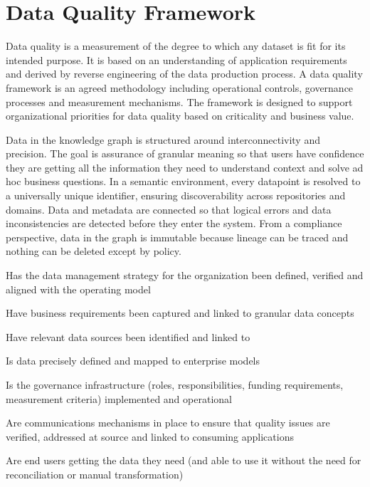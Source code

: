 \section{Data Quality Framework}\label{sec:ekgmm-b-3-1} %

Data quality is a measurement of the degree to which any dataset is fit for its intended purpose.
It is based on an understanding of application requirements and derived by reverse engineering of the data production process.
A data quality framework is an agreed methodology including operational controls, governance processes and measurement mechanisms.
The framework is designed to support organizational priorities for data quality based on criticality and business value.

\kgmmekgrationalesection

Data in the knowledge graph is structured around interconnectivity and precision.
The goal is assurance of granular meaning so that users have confidence they are getting all the information they need to understand context and solve ad hoc business questions.
In a semantic environment, every datapoint is resolved to a universally unique identifier, ensuring discoverability across repositories and domains.
Data and metadata are connected so that logical errors and data inconsistencies are detected before they enter the system.
From a compliance perspective, data in the graph is immutable because lineage can be traced and nothing can be deleted except by policy.

\kgmmcorequestionssection

\begin{core-questions}

  \item [\thesection.1] Has the data management strategy for the organization been defined, verified and aligned with the operating model
  \item [\thesection.2] Have business requirements been captured and linked to granular data concepts
  \item [\thesection.3] Have relevant data sources been identified and linked to 
  \item [\thesection.4] Is data precisely defined and mapped to enterprise models
  \item [\thesection.5] Is the governance infrastructure (roles, responsibilities, funding requirements, measurement criteria) implemented and operational
  \item [\thesection.6] Are communications mechanisms in place to ensure that quality issues are verified, addressed at source and linked to consuming applications
  \item [\thesection.7] Are end users getting the data they need (and able to use it without the need for reconciliation or manual transformation)

\end{core-questions}

